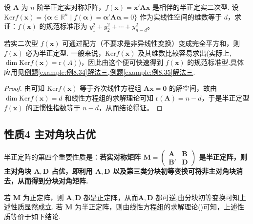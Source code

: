 \documentclass[../../main.tex]{subfiles}%
\begin{document}
\begin{proposition}\label{proposition:利用核空间求半正定型的规范标准型}
设 $\boldsymbol{A}$ 为 $n$ 阶半正定实对称矩阵，$f(\boldsymbol{x})=\boldsymbol{x}'\boldsymbol{A}\boldsymbol{x}$ 是相伴的半正定实二次型. 设 $\mathrm{Ker} f(\boldsymbol{x}) =\{\boldsymbol{\alpha}\in\mathbb{R}^n\mid f(\boldsymbol{\alpha})=\boldsymbol{\alpha}'\boldsymbol{A}\boldsymbol{\alpha}=0\}$ 作为实线性空间的维数等于 $d$，求证：$f(\boldsymbol{x})$ 的规范标准形为 $y_1^2 + y_2^2+\cdots + y_{n - d}^2$。
\end{proposition}
\begin{remark}
若实二次型 $f(\boldsymbol{x})$ 可通过配方（不要求是非异线性变换）变成完全平方和，则 $f(\boldsymbol{x})$ 必为半正定型. 一般来说，$\mathrm{Ker} f(\boldsymbol{x})$ 及其维数比较容易求出(实际上,$\dim \mathrm{Ker} f(\boldsymbol{x})=\mathrm{r}(A)$)，因此由这个便可快速得到 $f(\boldsymbol{x})$ 的规范标准型.具体应用见\hyperref[example:例8.34]{例题\ref{example:例8.34}解法三},\hyperref[example:例8.35]{例题\ref{example:例8.35}解法三}.
\end{remark}
\begin{proof}

由可知 $\mathrm{Ker} f(\boldsymbol{x})$ 等于齐次线性方程组 $\boldsymbol{A}\boldsymbol{x}=\boldsymbol{0}$ 的解空间，故由 $\dim\mathrm{Ker} f(\boldsymbol{x}) = d$ 和线性方程组的求解理论可知 $\mathrm{r}(\boldsymbol{A}) = n - d$，于是半正定型 $f(\boldsymbol{x})$ 的正惯性指数等于 $n - d$，从而结论得证。

\end{proof}


\subsection{性质4 主对角块占优}

半正定阵的第四个重要性质是：\textbf{若实对称矩阵 $\boldsymbol{M}=\begin{pmatrix}
\boldsymbol{A} & \boldsymbol{B} \\
\boldsymbol{B}' & \boldsymbol{D}
\end{pmatrix}$ 是半正定阵，则主对角块 $\boldsymbol{A},\boldsymbol{D}$ 占优，即利用 $\boldsymbol{A},\boldsymbol{D}$ 以及第三类分块初等变换可将非主对角块消去，从而得到分块对角矩阵.} 

若 $\boldsymbol{M}$ 为正定阵，则 $\boldsymbol{A},\boldsymbol{D}$ 都是正定阵，从而$\boldsymbol{A},\boldsymbol{D}$ 都可逆,由分块初等变换可知上述性质显然成立. 若 $\boldsymbol{M}$ 为半正定阵，则由线性方程组的求解理论()可知，上述性质等价于如下结论.
\end{document}

